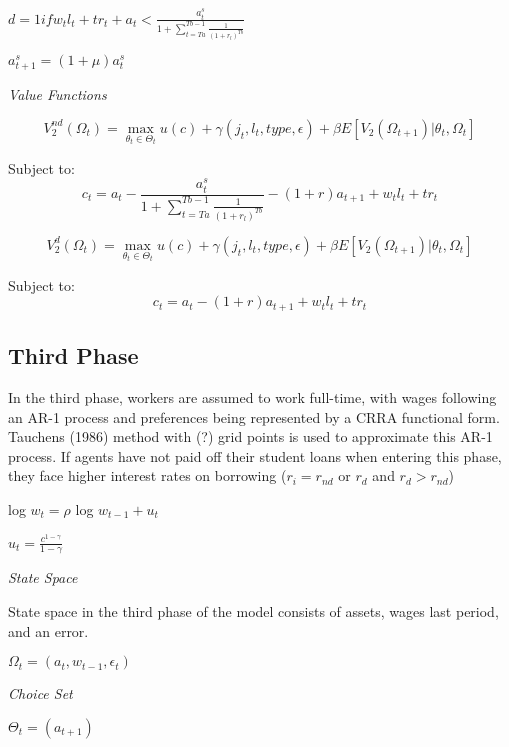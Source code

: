 \documentclass[letterpaper,12pt]{article}
\begin{document}
$d = 1 if w_t l_t + tr_t +  a_t < \frac{a^s_t}{1 + \sum_{t = Ta}^{Tb-1} \frac{1}{(1 + r_l)^{Tb}}}$

$a^s_{t+1} = (1 + \mu)a^s_t$

\noindent \emph{Value Functions}

\begin{equation}
V^{nd}_2(\Omega_t) = \max_{\theta_t \in \Theta_t} u(c) + \gamma(j_t, l_t, type, \epsilon) + \beta E[V_2(\Omega_{t+1})|\theta_t, \Omega_{t}] 
\end{equation}

Subject to:
\begin{equation}
c_t = a_t - \frac{a^s_t}{1 + \sum_{t = Ta}^{Tb-1} \frac{1}{(1 + r_l)^{Tb}}} - (1+r)a_{t+1} +  w_t l_t + tr_t
\end{equation}

\begin{equation}
V^{d}_2(\Omega_t) = \max_{\theta_t \in \Theta_t} u(c) + \gamma(j_t, l_t, type, \epsilon) + \beta E[V_2(\Omega_{t+1})|\theta_t, \Omega_{t}] 
\end{equation}

Subject to:
\begin{equation}
c_t = a_t  - (1+r)a_{t+1} +  w_t l_t + tr_t
\end{equation}

\subsection{Third Phase}

In the third phase, workers are assumed to work full-time, with wages following an AR-1 process and preferences being represented by a CRRA functional form. Tauchens (1986) method with (?) grid points is used to approximate this AR-1 process. If agents have not paid off their student loans when entering this phase, they face higher interest rates on borrowing ($r_i = r_{nd}$ or $r_d$ and $r_{d} > r_{nd}$)

log $w_t = \rho$ log $w_{t-1} + u_t$

$u_t = \frac{c^{1-\gamma}}{1 - \gamma}$

\noindent \emph{State Space}

State space in the third phase of the model consists of assets, wages last period, and an error. 

$\Omega_t = (a_t, w_{t-1}, \epsilon_t)$

\noindent \emph{Choice Set}

$\Theta_t = (a_{t+1})$
\end{document}
